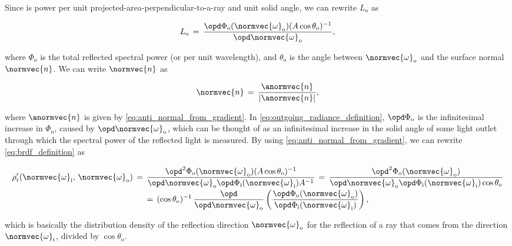 Since \radiance is power per unit projected-area-perpendicular-to-a-ray and unit solid angle, we can rewrite $L_{\text{o}}$ as

\begin{equation} \label{eq:outgoing_radiance_definition}
L_{\text{o}} \,=\, \frac{\opd \Phi_{\text{o}}(\normvec{\omega}_{\text{o}})(A\cos\theta_{\text{o}})^{-1}}{\opd \normvec{\omega}_{\text{o}}},
\end{equation}

where $\Phi_{\text{o}}$ is the total reflected spectral power (or  per unit wavelength), and $\theta_{\text{o}}$ is the angle between $\normvec{\omega}_{\text{o}}$ and the surface normal $\normvec{n}$. We can write $\normvec{n}$ as

\begin{equation} \label{eq:normal_from_antinormal}
\normvec{n} \,=\, \frac{\anormvec{n}}{|\anormvec{n}|},
\end{equation}

where $\anormvec{n}$ is given by \eqref{eq:anti_normal_from_gradient}. In \eqref{eq:outgoing_radiance_definition}, $\opd \Phi_{\text{o}}$ is the infinitesimal increase in $\Phi_{\text{o}}$, caused by $\opd \normvec{\omega}_{\text{o}}$, which can be thought of as an infinitesimal increase in the solid angle of some light outlet through which the spectral power of the reflected light is measured. By using \eqref{eq:anti_normal_from_gradient}, we can rewrite \eqref{eq:brdf_definition} as

\begin{equation} \label{eq:brdf_rewritten}
\renewcommand*{\arraystretch}{2}
\begin{array}{c}
\displaystyle \rho'_{\text{r}}(\normvec{\omega}_{\text{i}},\, \normvec{\omega}_{\text{o}}) \,=\, \frac{\opd^2 \Phi_{\text{o}}(\normvec{\omega}_{\text{o}})(A\cos\theta_{\text{o}})^{-1}}{\opd \normvec{\omega}_{\text{o}}\opd \Phi_{\text{i}}(\normvec{\omega}_{\text{i}})A^{-1}} \,=\, \frac{\opd^2 \Phi_{\text{o}}(\normvec{\omega}_{\text{o}})}{\opd \normvec{\omega}_{\text{o}}\opd \Phi_{\text{i}}(\normvec{\omega}_{\text{i}})\cos\theta_{\text{o}}} \\
\displaystyle =\, (\cos\theta_{\text{o}})^{-1}\, \frac{\opd}{\opd \normvec{\omega}_{\text{o}}}\left(\frac{\opd \Phi_{\text{o}}(\normvec{\omega}_{\text{o}})}{\opd \Phi_{\text{i}}(\normvec{\omega}_{\text{i}})}\right),
\end{array}
\end{equation}

which is basically the distribution density of the reflection direction $\normvec{\omega}_{\text{o}}$ for the reflection of a ray that comes from the direction $\normvec{\omega}_{\text{i}}$, divided by $\cos\theta_{\text{o}}$.

